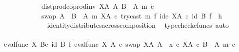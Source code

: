 \begin{isabellebody}
\ \ \ \ \ \ \ \ \ \ \ \ dist{\isacharunderscore}{\kern0pt}prod{\isacharunderscore}{\kern0pt}coprod{\isacharunderscore}{\kern0pt}inv\ {\isacharparenleft}{\kern0pt}X\isactrlbsup A\isactrlesup {\isacharparenright}{\kern0pt}\ A\ {\isacharparenleft}{\kern0pt}B\ {\isasymsetminus}\ {\isacharparenleft}{\kern0pt}A{\isacharcomma}{\kern0pt}\ m{\isacharparenright}{\kern0pt}{\isacharparenright}{\kern0pt}\ {\isasymcirc}\isactrlsub c\isanewline
\ \ \ \ \ \ \ \ \ \ \ \ swap\ {\isacharparenleft}{\kern0pt}A\ {\isasymCoprod}\ {\isacharparenleft}{\kern0pt}B\ {\isasymsetminus}\ {\isacharparenleft}{\kern0pt}A{\isacharcomma}{\kern0pt}\ m{\isacharparenright}{\kern0pt}{\isacharparenright}{\kern0pt}{\isacharparenright}{\kern0pt}\ {\isacharparenleft}{\kern0pt}X\isactrlbsup A\isactrlesup {\isacharparenright}{\kern0pt}\ {\isasymcirc}\isactrlsub c\ try{\isacharunderscore}{\kern0pt}cast\ m\ {\isasymtimes}\isactrlsub f\ id\isactrlsub c\ {\isacharparenleft}{\kern0pt}X\isactrlbsup A\isactrlesup {\isacharparenright}{\kern0pt}{\isacharparenright}{\kern0pt}\isactrlsup {\isasymsharp}{\isacharparenright}{\kern0pt}{\isacharparenright}{\kern0pt}\ {\isasymcirc}\isactrlsub c\ {\isacharparenleft}{\kern0pt}id\ B\ {\isasymtimes}\isactrlsub f\ \ h{\isacharparenright}{\kern0pt}{\isachardoublequoteclose}\isanewline
\ \ \ \ \ \ \ \ \ \ \ \ \isamarkupfalse%
\ identity{\isacharunderscore}{\kern0pt}distributes{\isacharunderscore}{\kern0pt}across{\isacharunderscore}{\kern0pt}composition\ \isamarkupfalse%
\ {\isacharparenleft}{\kern0pt}typecheck{\isacharunderscore}{\kern0pt}cfuncs{\isacharcomma}{\kern0pt}\ auto{\isacharparenright}{\kern0pt}\isanewline
\ \ \ \ \ \ \ \ \ \ \isamarkupfalse%
\ \isamarkupfalse%
\ {\isachardoublequoteopen}{\isacharparenleft}{\kern0pt}{\isacharparenleft}{\kern0pt}eval{\isacharunderscore}{\kern0pt}func\ X\ B{\isacharparenright}{\kern0pt}{\isasymcirc}\isactrlsub c\ {\isacharparenleft}{\kern0pt}id\ B\ {\isasymtimes}\isactrlsub f\ {\isacharparenleft}{\kern0pt}{\isacharparenleft}{\kern0pt}{\isacharparenleft}{\kern0pt}eval{\isacharunderscore}{\kern0pt}func\ X\ A\ {\isasymcirc}\isactrlsub c\ swap\ {\isacharparenleft}{\kern0pt}X\isactrlbsup A\isactrlesup {\isacharparenright}{\kern0pt}\ A{\isacharparenright}{\kern0pt}\ {\isasymamalg}\ {\isacharparenleft}{\kern0pt}x\ {\isasymcirc}\isactrlsub c\ {\isasymbeta}\isactrlbsub X\isactrlbsup A\isactrlesup \ {\isasymtimes}\isactrlsub c\ {\isacharparenleft}{\kern0pt}B\ {\isasymsetminus}\ {\isacharparenleft}{\kern0pt}A{\isacharcomma}{\kern0pt}\ m{\isacharparenright}{\kern0pt}{\isacharparenright}{\kern0pt}\isactrlesub {\isacharparenright}{\kern0pt}\ {\isasymcirc}\isactrlsub c\isanewline

\end{isabellebody}
